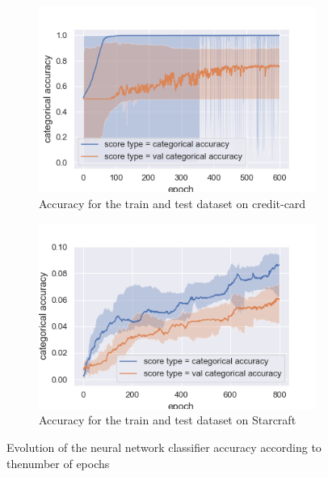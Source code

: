 \documentclass[10pt]{article}
\begin{document}
		\begin{figure}
			\centering
			\begin{subfigure}[]{0.45\columnwidth}
				\centering
				\includegraphics[width=\linewidth]{../graphics/per_creditcard_epoch_score_type_score_type_full.png}
				\caption{Accuracy for the train and test dataset on credit-card}
				\label{per_cc_train_vs_test}
			\end{subfigure}
			\begin{subfigure}[]{0.45\columnwidth}
				\centering
				\includegraphics[width=\linewidth]{../graphics/per_starcraft_epoch_score_type_score_type_full.png}
				\caption{Accuracy for the train and test dataset on Starcraft}
				\label{per_sc_train_vs_test}
			\end{subfigure}
			\caption{Evolution of the neural network classifier accuracy according to thenumber of epochs}
			\label{per_train_vs_test}
		\end{figure}
\end{document}
